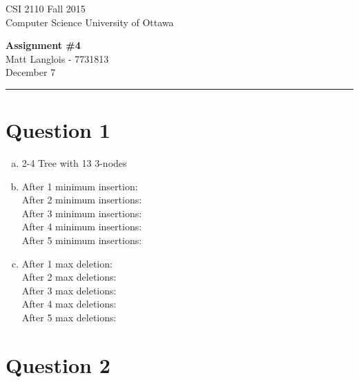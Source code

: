 \documentclass[fleqn, 12pt]{article}
\begin{document}
\noindent
CSI 2110 \hfill Fall 2015\\
Computer Science \hfill University of Ottawa
\begin{center}
{\bf Assignment \#4}\\
Matt Langlois - 7731813\\
December 7\\ \vspace{24pt}
\end{center}

\hrule

\vspace{12pt}

\section*{Question 1}

\begin{enumerate}[a)]
\item 2-4 Tree with 13 3-nodes\\
\item 
    After 1 minimum insertion: \\
    After 2 minimum insertions: \\
    After 3 minimum insertions: \\
    \newpage
    After 4 minimum insertions: \\ 
    After 5 minimum insertions: \\
\item 
    After 1 max deletion: \\
    After 2 max deletions: \\
    After 3 max deletions: \\
    After 4 max deletions: \\
    After 5 max deletions: \\
\end{enumerate}


\section*{Question 2}
\end{document}
